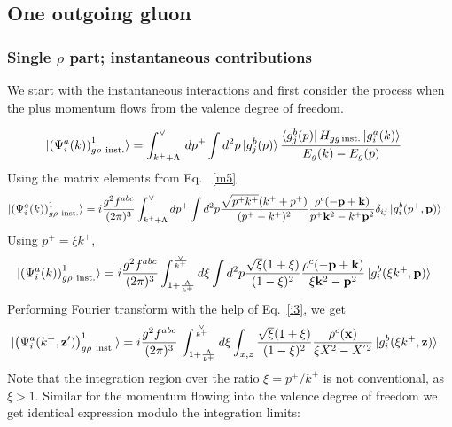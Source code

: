 \documentclass[aps,prd,amsmath,amssymb,nofootinbib]{revtex4-2}
\def\v#1{\mathbf{#1}}
\numberwithin{equation}{section}
\begin{document}
\subsection{One outgoing gluon}
\subsubsection{Single $\rho$ part; instantaneous contributions}
We start with the instantaneous interactions and   first consider  the process when the plus momentum flows from the valence degree of freedom. 
\begin{figure}[h]
\end{figure}
\begin{align}\label{oneginst1}
  \ket{ \left(\Psi^{a}_{i}(k) \right)^{1}_{g \rho\ {\rm inst.} } }
   & = \int_{k^{+}+\Lambda}^{\vee}\,
   d p^+ \int d^2p %
   \ket{g_{j}^{b}(p)} 
   \frac{ \bra{g_{j}^{b}(p)}H_{gg\,\text{inst.}}\ket{g_{i}^{a}(k)}}{E_{g}(k)-E_{g}(p)}
\end{align}
Using the matrix elements from Eq.~ \eqref{m5}
\begin{align}\label{oneginst11}
\ket{ \left(\Psi^{a}_{i}(k) \right)^{1}_{g \rho\ {\rm inst.} } }   & = i \frac{g^2 f^{abc}}{(2\pi)^3} 
   \int_{k^+ + \Lambda}^{\vee} %
   d p^+ \int d^2p %
   \frac{\sqrt{p^{+}k^{+}} (k^++p^+) } {(p^+-k^+)^2} \frac{\rho^c(-\v{p}+\v{k})}{p^{+}\v{k}^2 - k^{+}\v{p}^2} \delta_{ij}
   \ket{g_{i}^{b}(p^{+},\v{p})}
\end{align}
Using $p^{+} = \xi k^{+}$,
\begin{align}
 \ket{ \left(\Psi^{a}_{i}(k) \right)^{1}_{g \rho\ {\rm inst.} } }   & = i \frac{g^2 f^{abc}}{(2\pi)^3} 
   \int_{ 1 + \frac{\Lambda}{k^+}   }^{  \frac{\vee}{k^+} } %
   d \xi \int d^2p %
   \frac{\sqrt{\xi} (1+\xi) } {(1-\xi)^2} \frac{\rho^c(-\v{p}+\v{k})}{\xi \v{k}^2 - \v{p}^2} 
   \ket{g_{i}^{b}(\xi k^+,\v{p})} 
\end{align}
Performing Fourier transform with the help of Eq.~\eqref{i3}, we get 
\begin{align}%
  \label{Eq:onegluoninstX1}
  \ket{ \left(\Psi^{a}_{i}(k^+, \v{z}') \right)^{1}_{g \rho\ {\rm inst.} } }%
   &= 
   i \frac{g^2 f^{abc}}{(2\pi)^3}\, \int_{ 1 + \frac{\Lambda}{k^+}   }^{  \frac{\vee}{k^+} } %
   d \xi  \int_{x,z} %
   \frac{\sqrt{\xi} (1+\xi) } {(1-\xi)^2} \frac{\rho^c(\v{x})}{\xi X^{2} - X^{'2} } 
   \ket{g_{i}^{b}(\xi k^+,\v{z})} 
\end{align}
Note that the integration region over the ratio $\xi = p^+/k^+$ is not conventional, as $\xi>1$. Similar for the  momentum flowing into the valence degree of freedom we get identical expression modulo the integration limits:
\end{document}
